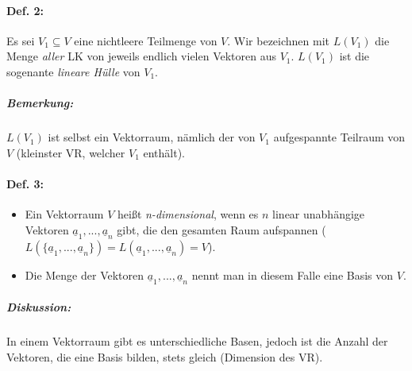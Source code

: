 \paragraph{Def. 2:} \parskp
Es sei $V_1 \subseteq V$ eine nichtleere Teilmenge von $V$. Wir bezeichnen mit $L(V_1)$ die Menge \emph{aller} LK von jeweils endlich vielen Vektoren aus $V_1$. $L(V_1)$ ist die sogenante \emph{lineare Hülle} von $V_1$.
\subparagraph{Bemerkung:} \parskp
$L(V_1)$ ist selbst ein Vektorraum, nämlich der von $V_1$ aufgespannte Teilraum von $V$ (kleinster VR, welcher $V_1$ enthält).

\paragraph{Def. 3:}
\begin{itemize}
\item Ein Vektorraum $V$ heißt \emph{n-dimensional}, wenn es $n$ linear unabhängige Vektoren $\underline{a}_1, ..., \underline{a}_n$ gibt, die den gesamten Raum aufspannen ($L(\{\underline{a}_1, ..., \underline{a}_n\})=L(\underline{a}_1, ..., \underline{a}_n)=V$).
\item Die Menge der Vektoren $\underline{a}_1, ..., \underline{a}_n$ nennt man in diesem Falle eine Basis von $V$.
\end{itemize}
\subparagraph{Diskussion:}\parskp
In einem Vektorraum gibt es unterschiedliche Basen, jedoch ist die Anzahl der Vektoren, die eine Basis bilden, stets gleich (Dimension des VR).
